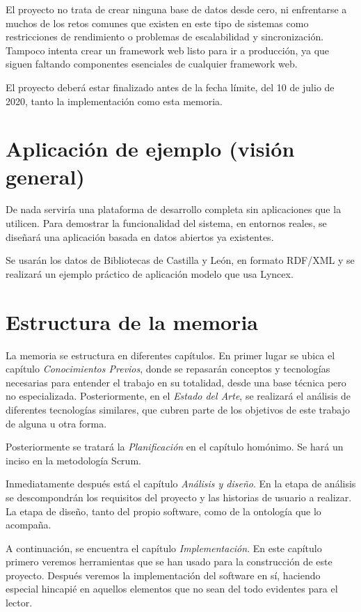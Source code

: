 \documentclass[12pt]{report} %
\begin{document}
El proyecto no trata de crear ninguna base de datos desde cero, ni enfrentarse a muchos de los retos comunes que existen en este tipo de sistemas como restricciones de rendimiento o problemas de escalabilidad y sincronización. Tampoco intenta crear un framework web listo para ir a producción, ya que siguen faltando componentes esenciales de cualquier framework web.

El proyecto deberá estar finalizado antes de la fecha límite, del 10 de julio de 2020, tanto la implementación como esta memoria.

\section{Aplicación de ejemplo (visión general)}

De nada serviría una plataforma de desarrollo completa sin aplicaciones que la utilicen. Para demostrar la funcionalidad del sistema, en entornos reales, se diseñará una aplicación basada en datos abiertos ya existentes.

Se usarán los datos de Bibliotecas de Castilla y León, en formato RDF/XML y se realizará un ejemplo práctico de aplicación modelo que usa Lyncex.

\section{Estructura de la memoria}
La memoria se estructura en diferentes capítulos. En primer lugar se ubica el capítulo \textit{Conocimientos Previos}, donde se repasarán conceptos y tecnologías necesarias para entender el trabajo en su totalidad, desde una base técnica pero no especializada. Posteriormente, en el \textit{Estado del Arte}, se realizará el análisis de diferentes tecnologías similares, que cubren parte de los objetivos de este trabajo de alguna u otra forma.

Posteriormente se tratará la \textit{Planificación} en el capítulo homónimo. Se hará un inciso en la metodología Scrum. 

Inmediatamente después está el capítulo \textit{Análisis y diseño}. En la etapa de análisis se descompondrán los requisitos del proyecto y las historias de usuario a realizar. La etapa de diseño, tanto del propio software, como de la ontología que lo acompaña. 

A continuación, se encuentra el capítulo \textit{Implementación}. En este capítulo primero veremos herramientas que se han usado para la construcción de este proyecto. Después veremos la implementación del software en sí, haciendo especial hincapié en aquellos elementos que no sean del todo evidentes para el lector.
\end{document}
